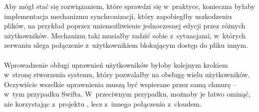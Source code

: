 Aby \cb{} mógł stać się rozwiązaniem, które sprawdzi się w~praktyce, konieczna
byłaby implementacja mechanizmu synchronizacji, który zapobiegłby uszkodzeniu
plików, na przykład poprzez uniemożliwienie jednoczesnej edycji przez różnych
użytkowników. Mechanizm taki musiałby radzić sobie z~sytuacjami, w~których
zerwaniu ulega połączenie z~użytkownikiem blokującym dostęp do pliku innym.

\paragraph{}

Wprowadzenie obługi uprawnień użytkowników byłoby kolejnym krokiem w~stronę
stworzenia systemu, który pozwalałby na obsługę wielu użytkowników. Oczywiście
wszelkie uprawnienia muszą być wspierane przez samą chmurę -- w~tym przypadku
Swifta. W~przeciwnym przypadku, możnaby je łatwo ominąć, nie korzystając
z~projektu \cb{}, lecz z~innego połączenia z~cloudem.

